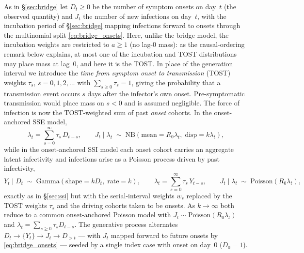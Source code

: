 \documentclass{article}
\theoremstyle{definition}
\begin{document}
As in \S\ref{sec:bridge} let $D_t \geq 0$ be the number of symptom onsets on
day~$t$ (the observed quantity) and $J_t$ the number of new infections on
day~$t$, with the incubation period of \S\ref{sec:bridge} mapping infections
forward to onsets through the multinomial split \eqref{eq:bridge_onsets}.  Here,
unlike the bridge model, the incubation weights are restricted to $a \geq 1$
(no lag-0 mass): as the causal-ordering remark below explains, at most one of the
incubation and TOST distributions may place mass at lag~0, and here it is the
TOST.  In
place of the generation interval we introduce the \emph{time from symptom onset
to transmission} (TOST) weights $\tau_s$, $s = 0, 1, 2, \ldots$ with
$\sum_{s \geq 0} \tau_s = 1$, giving the probability that a transmission event
occurs $s$ days after the infector's own onset.  Pre-symptomatic transmission
would place mass on $s < 0$ and is assumed negligible.  The force of infection is
now the TOST-weighted sum of past \emph{onset} cohorts.  In the onset-anchored
SSE model,
\begin{equation}\label{eq:onset_sse}
  \lambda_t = \sum_{s=0}^{\infty} \tau_s\, D_{t-s},
  \qquad
  J_t \mid \lambda_t \;\sim\;
  \mathrm{NB}\!\left(\text{mean} = R_0 \lambda_t,\; \text{disp} = k\lambda_t
  \right),
\end{equation}
while in the onset-anchored SSI model each onset cohort carries an aggregate
latent infectivity and infections arise as a Poisson process driven by past
infectivity,
\begin{equation}\label{eq:onset_ssi}
  Y_t \mid D_t \;\sim\; \mathrm{Gamma}\!\left(\text{shape} = k D_t,\;
  \text{rate} = k\right),
  \qquad
  \lambda_t = \sum_{s=0}^{\infty} \tau_s\, Y_{t-s},
  \qquad
  J_t \mid \lambda_t \;\sim\; \mathrm{Poisson}\!\left(R_0 \lambda_t\right),
\end{equation}
exactly as in \S\ref{sec:ssi} but with the serial-interval weights $w_s$ replaced
by the TOST weights $\tau_s$ and the driving cohorts taken to be onsets.  As
$k \to \infty$ both reduce to a common onset-anchored Poisson model with
$J_t \sim \mathrm{Poisson}(R_0 \lambda_t)$ and
$\lambda_t = \sum_{s \geq 0} \tau_s D_{t-s}$.  The generative process alternates
$D_t \to \{Y_t\} \to J_t \to D_{>t}$ --- with $J_t$ mapped forward to future
onsets by \eqref{eq:bridge_onsets} --- seeded by a single index case with onset
on day~0 ($D_0 = 1$).
\end{document}
